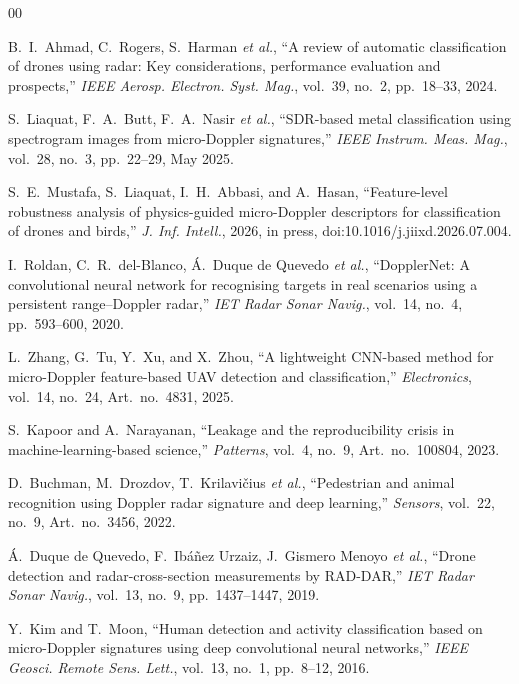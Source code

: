 \documentclass[conference]{IEEEtran}
\begin{document}
\begin{thebibliography}{00}

 B.~I.~Ahmad, C.~Rogers, S.~Harman \emph{et al.}, ``A review of automatic classification of drones using radar: Key considerations, performance evaluation and prospects,'' \emph{IEEE Aerosp. Electron. Syst. Mag.}, vol.~39, no.~2, pp.~18--33, 2024.

 S.~Liaquat, F.~A.~Butt, F.~A.~Nasir \emph{et al.}, ``SDR-based metal classification using spectrogram images from micro-Doppler signatures,'' \emph{IEEE Instrum. Meas. Mag.}, vol.~28, no.~3, pp.~22--29, May 2025.

 S.~E.~Mustafa, S.~Liaquat, I.~H.~Abbasi, and A.~Hasan, ``Feature-level robustness analysis of physics-guided micro-Doppler descriptors for classification of drones and birds,'' \emph{J. Inf. Intell.}, 2026, in press, doi:10.1016/j.jiixd.2026.07.004.

 I.~Roldan, C.~R.~del-Blanco, \'A.~Duque de Quevedo \emph{et al.}, ``DopplerNet: A convolutional neural network for recognising targets in real scenarios using a persistent range--Doppler radar,'' \emph{IET Radar Sonar Navig.}, vol.~14, no.~4, pp.~593--600, 2020.

 L.~Zhang, G.~Tu, Y.~Xu, and X.~Zhou, ``A lightweight CNN-based method for micro-Doppler feature-based UAV detection and classification,'' \emph{Electronics}, vol.~14, no.~24, Art.~no.~4831, 2025.

 S.~Kapoor and A.~Narayanan, ``Leakage and the reproducibility crisis in machine-learning-based science,'' \emph{Patterns}, vol.~4, no.~9, Art.~no.~100804, 2023.

 D.~Buchman, M.~Drozdov, T.~Krilavi\v{c}ius \emph{et al.}, ``Pedestrian and animal recognition using Doppler radar signature and deep learning,'' \emph{Sensors}, vol.~22, no.~9, Art.~no.~3456, 2022.

 \'A.~Duque de Quevedo, F.~Ib\'a\~nez Urzaiz, J.~Gismero Menoyo \emph{et al.}, ``Drone detection and radar-cross-section measurements by RAD-DAR,'' \emph{IET Radar Sonar Navig.}, vol.~13, no.~9, pp.~1437--1447, 2019.

 Y.~Kim and T.~Moon, ``Human detection and activity classification based on micro-Doppler signatures using deep convolutional neural networks,'' \emph{IEEE Geosci. Remote Sens. Lett.}, vol.~13, no.~1, pp.~8--12, 2016.


\end{thebibliography}
\end{document}
